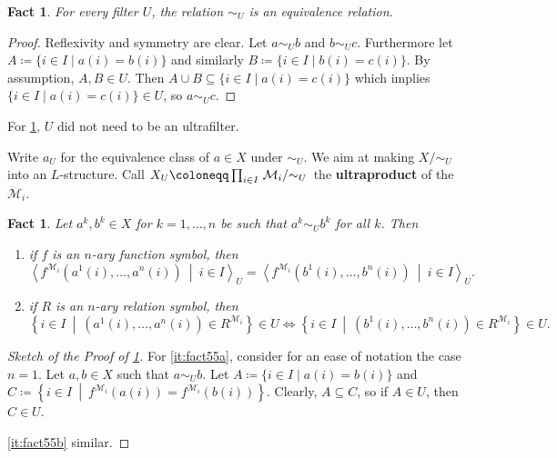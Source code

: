 \documentclass{article}
\newtheorem{nfact}[nthm]{Fact}
\newcommand{\named}[1]{\textbf{#1}\index{#1}}
\begin{document}
\begin{nfact} \label{fact:5.4}
For every filter $U$, the relation $\sim_U$ is an equivalence relation.
\end{nfact}
\begin{proof}
Reflexivity and symmetry are clear. Let $a \sim_U b$ and $b \sim_U c$. Furthermore let $A \coloneqq \{i \in I \mid a(i)=b(i) \}$ and similarly $B \coloneqq \{i \in I \mid b(i)=c(i) \}$. By assumption, $A, B \in U$. Then  $ A \cup B \subseteq \{i \in I \mid a(i) = c(i)\}$
which implies $\{i \in I \mid a(i) = c(i)\} \in U$, so $a \sim_U c$.
\end{proof}
\begin{remark}
For \cref{fact:5.4}, $U$ did not need to be an ultrafilter.
\end{remark}

Write $a_U$ for the equivalence class of $a \in X$ under $\sim_U$. We aim at making $X/{\sim_U}$ into an $L$-structure. Call $X_U \coloneqq \prod_{i \in I} \left. \mathcal{M}_i \middle/ {\sim_U} \right.$ the \named{ultraproduct} of the $\mathcal{M}_i$.

\begin{nfact} \label{fact:5.5}
Let $a^k, b^k \in X$ for $k = 1, \dots, n$ be such that $a^k \sim_U b^k$ for all $k$. Then
\begin{enumerate}[label=(\roman*)]
\item if $f$ is an $n$-ary function symbol, then
\[
\left< f^{\mathcal{M}_i}(a^1(i), \dots, a^n(i)) \ \middle|\ i \in I \right>_U = 
\left< f^{\mathcal{M}_i}(b^1(i), \dots, b^n(i)) \ \middle|\ i \in I \right>_U.
\] \label{it:fact55a}
\item if $R$ is an $n$-ary relation symbol, then 
\[
\left\{ i \in I \ \middle|\ (a^1(i), \dots, a^n(i)) \in R^{\mathcal{M}_i} \right\} \in U \iff
\left\{ i \in I \ \middle|\ (b^1(i), \dots, b^n(i)) \in R^{\mathcal{M}_i} \right\} \in U.
\] \label{it:fact55b}
\end{enumerate}
\end{nfact}
\begin{proof}[Sketch of the Proof of \cref{fact:5.5}]
For \cref{it:fact55a}, consider for an ease of notation the case $n = 1$. Let $a, b \in X$ such that $a \sim_U b$. Let  $A \coloneqq \{i \in I \mid a(i)=b(i) \}$ and $C \coloneqq \left\{ i \in I \ \middle|\ f^{\mathcal{M}_i}(a(i)) = f^{\mathcal{M}_i}(b(i)) \right\}$. Clearly, $A \subseteq C$, so if $A \in U$, then $C \in U$.

\cref{it:fact55b} similar.
\end{proof}
\end{document}
